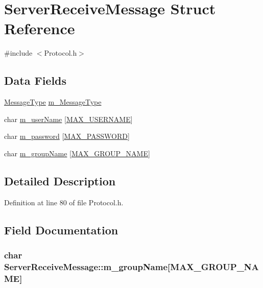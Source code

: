 \hypertarget{structServerReceiveMessage}{}\section{Server\+Receive\+Message Struct Reference}
\label{structServerReceiveMessage}


{\ttfamily \#include $<$Protocol.\+h$>$}

\subsection*{Data Fields}
\begin{DoxyCompactItemize}
\item 
\hyperlink{Protocol_8h_ac6606ebe91c8ac66a2c314c79f5ab013}{Message\+Type} \hyperlink{structServerReceiveMessage_a00ebf9c3db5a28c62cb54ccfaffe1b27}{m\+\_\+\+Message\+Type}
\item 
char \hyperlink{structServerReceiveMessage_abadd97dfb24d6ced8419f6737b3155c2}{m\+\_\+user\+Name} \mbox{[}\hyperlink{Protocol_8h_a2d9316e742860ef57fe46a27e67d5efe}{M\+A\+X\+\_\+\+U\+S\+E\+R\+N\+A\+ME}\mbox{]}
\item 
char \hyperlink{structServerReceiveMessage_a6def7f46d5d3f51d29b4e819fe624e35}{m\+\_\+password} \mbox{[}\hyperlink{Protocol_8h_ac39f75a2a532f10f6fb237e96c530dcb}{M\+A\+X\+\_\+\+P\+A\+S\+S\+W\+O\+RD}\mbox{]}
\item 
char \hyperlink{structServerReceiveMessage_a18aeb01f3ed63139069652875b8be9a6}{m\+\_\+group\+Name} \mbox{[}\hyperlink{Protocol_8h_adc4e6fd253319f9ad9e2d019d4ac021d}{M\+A\+X\+\_\+\+G\+R\+O\+U\+P\+\_\+\+N\+A\+ME}\mbox{]}
\end{DoxyCompactItemize}


\subsection{Detailed Description}


Definition at line 80 of file Protocol.\+h.



\subsection{Field Documentation}
\subsubsection[{\texorpdfstring{m\+\_\+group\+Name}{m_groupName}}]{\setlength{\rightskip}{0pt plus 5cm}char Server\+Receive\+Message\+::m\+\_\+group\+Name\mbox{[}{\bf M\+A\+X\+\_\+\+G\+R\+O\+U\+P\+\_\+\+N\+A\+ME}\mbox{]}}\hypertarget{structServerReceiveMessage_a18aeb01f3ed63139069652875b8be9a6}{}\label{structServerReceiveMessage_a18aeb01f3ed63139069652875b8be9a6}


